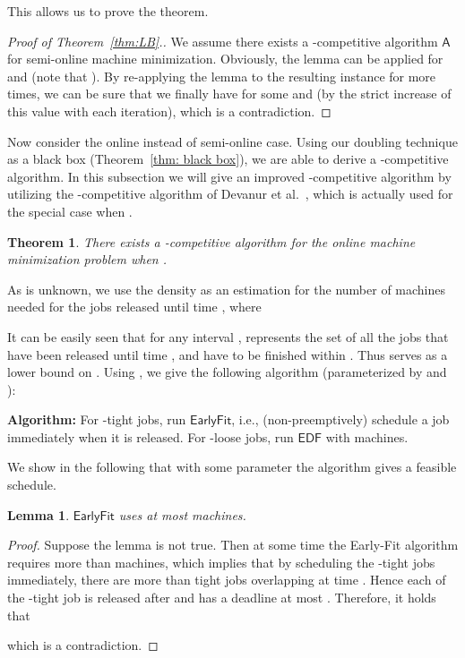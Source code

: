 \documentclass[letterpaper,11pt]{article}
\newtheorem{theorem}{Theorem}
\newtheorem{lemma}{Lemma}
\newcommand{\EDF}{\ensuremath{\mathsf{EDF}}\xspace}
\newcommand{\Earlyfit}{\ensuremath{\mathsf{EarlyFit}}\xspace}
\newcommand{\A}{\ensuremath{\mathsf{A}}\xspace}
\begin{document}
This allows us to prove the theorem.

\begin{proof}[Proof of Theorem~\ref{thm:LB}.]
We assume there exists a -competitive algorithm \A for semi-online machine minimization. Obviously, the lemma can be applied for  and  (note that ). By re-applying the lemma to the resulting instance for  more times, we can be sure that we finally have  for some  and  (by the strict increase of this value with each iteration), which is a contradiction.
\end{proof}

Now consider the online instead of semi-online case. Using our doubling technique as a black box (Theorem~\ref{thm: black box}), we are able to derive a  -competitive algorithm. In this subsection we will give an improved -competitive algorithm by utilizing the -competitive algorithm of Devanur et
al.~\cite{DevanurMPY14}, which is actually used for the special case when .

\begin{theorem}\label{thm:preempt-samesize-optunknown}
There exists a -competitive algorithm for the online machine minimization problem when .
\end{theorem}

As  is unknown, we use the density  as an estimation for the number of machines needed for the jobs released until time , where

It can be easily seen that for any interval ,  represents the set of all the jobs that have been released until time , and have to be finished within . Thus  serves as a lower bound on . Using , we give the following algorithm (parameterized by  and ):

\medskip
\noindent\textbf{Algorithm:} For -tight jobs, run \Earlyfit, i.e., (non-preemptively) schedule a job immediately when it is released. For -loose jobs, run \EDF with  machines.
\medskip

We show in the following that with some parameter  the algorithm gives a feasible schedule.

\begin{lemma}
\Earlyfit uses at most  machines.
\end{lemma}
\begin{proof}
Suppose the lemma is not true. Then at some time  the Early-Fit algorithm requires more than  machines, which implies that by scheduling the -tight jobs immediately, there are more than  tight jobs overlapping at time . Hence each of the -tight job is released after  and has a deadline at most . Therefore, it holds that 

which is a contradiction.
\end{proof}
\end{document}
